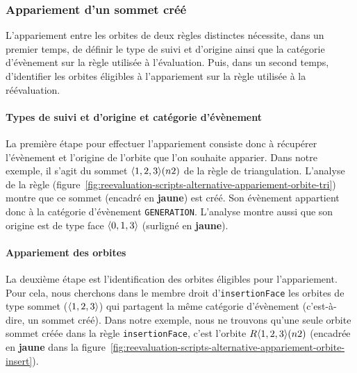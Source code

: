 \subsubsection{Appariement d'un sommet créé}
\label{sec:reevaluation-scripts-alternative-appariement-creation-sommet}



L'appariement entre les orbites de deux règles distinctes nécessite, dans un
premier temps, de définir le type de suivi et d'origine ainsi que la catégorie
d'évènement sur la règle utilisée à l'évaluation. %
Puis, dans un second temps, d'identifier les orbites éligibles à l'appariement
sur la règle utilisée à la réévaluation.



\paragraph{Types de suivi et d'origine et catégorie d'évènement}



La première étape pour effectuer l'appariement consiste donc à récupérer
l'évènement et l'origine de l'orbite que l'on souhaite apparier. %
Dans notre exemple, il s'agit du sommet \(\langle1,2,3\rangle(\allowbreak{}n2)\) de la règle de
triangulation. %
L'analyse de la règle
(figure~\ref{fig:reevaluation-scripts-alternative-appariement-orbite-tri})
montre que ce sommet (encadré en \textbf{\textcolor{mylightorange}{jaune}}) est créé. Son
évènement appartient donc à la catégorie d'évènement \texttt{GENERATION}. %
L'analyse montre aussi que son origine est de type face \(\langle0,1,3\rangle\)
(surligné en \textbf{\textcolor{mylightorange}{jaune}}). %



\paragraph{Appariement des orbites}



La deuxième étape est l'identification des orbites éligibles pour
l'appariement. %
Pour cela, nous cherchons dans le membre droit d'\texttt{insertion\-Face} les
orbites de type sommet (\(\langle1,2,3\rangle\)) qui partagent la même catégorie
d'évènement (c'est-à-dire, un sommet créé). %
Dans notre exem\-ple, nous ne trouvons qu'une seule orbite sommet créée dans la
règle \texttt{insertion\-Face}, c'est l'orbite \(R\langle1,2,3\rangle(n2)\)
(encadrée en \textbf{\textcolor{mylightorange}{jaune}} dans la
figure~\ref{fig:reevaluation-scripts-alternative-appariement-orbite-insert}). %

